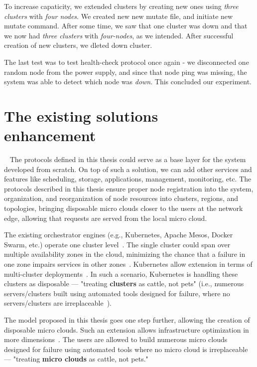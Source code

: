To increase capaticity, we extended clusters by creating new ones using \emph{three clusters} with \emph{four nodes}. We created new new mutate file, and initiate new mutate command. After some time, we saw that one cluster was down and that we now had \emph{three clusters} with \emph{four-nodes}, as we intended. After successful creation of new clusters, we dleted down cluster.

The last test was to test health-check protocol once again - we disconnected one random node from the power supply, and since that node ping was missing, the system was able to detect which node was \emph{down}. This concluded our experiment.
%
\section{The existing solutions enhancement}~\label{enhancement_of_the_existing_solutions}
%
The protocols defined in this thesis could serve as a base layer for the system developed from scratch. On top of such a solution, we can add other services and features like scheduling, storage, applications, management, monitoring, etc. The protocols described in this thesis ensure proper node registration into the system, organization, and reorganization of node resources into clusters, regions, and topologies, bringing disposable micro clouds closer to the users at the network edge, allowing that requests are served from the local micro cloud.

The existing orchestrator engines (e.g., Kubernetes, Apache Mesos, Docker Swarm, etc.) operate one cluster level~\cite{BurnsGOBW16, VermaPKOTW15, RossiCPN20, KubeEdge, KubeMulti}. The single cluster could span over multiple availability zones in the cloud, minimizing the chance that a failure in one zone impairs services in other zones~\cite{KubeMulti}. Kubernetes allow extension in terms of multi-cluster deployments~{\cite{KubeMulti}}. In such a scenario, Kubernetes is handling these clusters as disposable --- "treating \textbf{clusters} as cattle, not pets" (i.e., numerous servers/clusters built using automated tools designed for failure, where no servers/clusters are irreplaceable~\cite{CERN}).

The model proposed in this thesis goes one step further, allowing the creation of disposable micro clouds. Such an extension allows infrastructure optimization in more dimensions~\cite{ForestieroMMPS14}. The users are allowed to build numerous micro clouds designed for failure using automated tools where no micro cloud is irreplaceable --- "treating \textbf{micro clouds} as cattle, not pets."


